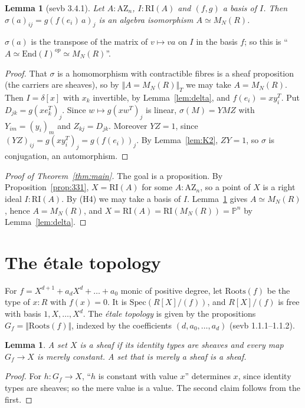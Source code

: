 \documentclass[11pt]{amsart}
\newtheorem{lemma}[theorem]{Lemma}
\theoremstyle{definition}
\theoremstyle{remark}
\newcommand{\Pn}{\mathbb{P}^n}
\newcommand{\M}{M_N(R)}
\newcommand{\AZ}{\mathrm{AZ}_n}
\newcommand{\RI}{\mathrm{RI}}
\newcommand{\tr}[1]{\Vert #1\Vert}
\newcommand{\trT}[1]{\Vert #1\Vert_T}
\newcommand{\Roots}{\mathrm{Roots}}
\begin{document}
\begin{lemma}[sevb 3.4.1]\label{lem:341}
Let $A:\AZ$, $I:\RI(A)$ and $(f,g)$ a basis of $I$. Then
$\sigma(a)_{ij}=g(f(e_i)\,a)_j$ is an algebra isomorphism $A\simeq\M$.
\end{lemma}
$\sigma(a)$ is the transpose of the matrix of $v\mapsto va$ on $I$ in the
basis $f$; so this is ``$A\simeq\mathrm{End}(I)^{op}\simeq\M$''.
\begin{proof}
That $\sigma$ is a homomorphism with contractible fibres is a sheaf
proposition (the carriers are sheaves), so by $\trT{A=\M}$ we may take
$A=\M$. Then $I=\delta[x]$ with $x_k$ invertible, by
Lemma~\ref{lem:delta}, and $f(e_i)=xy_i^T$. Put $D_{jk}=g(xe_k^T)_j$. Since
$w\mapsto g(xw^T)_j$ is linear, $\sigma(M)=YMZ$ with $Y_{im}=(y_i)_m$ and
$Z_{kj}=D_{jk}$. Moreover $YZ=1$, since $(YZ)_{ij}=g(xy_i^T)_j=g(f(e_i))_j$.
By Lemma~\ref{lem:K2}, $ZY=1$, so $\sigma$ is conjugation, an automorphism.
\end{proof}

\begin{proof}[Proof of Theorem~\ref{thm:main}]
The goal is a proposition. By Proposition~\ref{prop:331}, $X=\RI(A)$ for
some $A:\AZ$, so a point of $X$ is a right ideal $I:\RI(A)$. By (H4) we may
take a basis of $I$. Lemma~\ref{lem:341} gives $A\simeq\M$, hence $A=\M$,
and $X=\RI(A)=\RI(\M)=\Pn$ by Lemma~\ref{lem:delta}.
\end{proof}

\section{The \'etale topology}\label{sec:etale}

For $f=X^{d+1}+a_dX^d+\dots+a_0$ monic of positive degree, let $\Roots(f)$ be
the type of $x:R$ with $f(x)=0$. It is $\mathrm{Spec}(R[X]/(f))$, and
$R[X]/(f)$ is free with basis $1,X,\dots,X^d$. The \emph{\'etale topology} is
given by the propositions $G_f=\tr{\Roots(f)}$, indexed by the coefficients
$(d,a_0,\dots,a_d)$ (sevb 1.1.1--1.1.2).

\begin{lemma}\label{lem:sets}
A set $X$ is a sheaf if its identity types are sheaves and every map
$G_f\to X$ is merely constant. A set that is merely a sheaf is a sheaf.
\end{lemma}
\begin{proof}
For $h:G_f\to X$, ``$h$ is constant with value $x$'' determines $x$, since
identity types are sheaves; so the mere value is a value. The second claim
follows from the first.
\end{proof}
\end{document}
